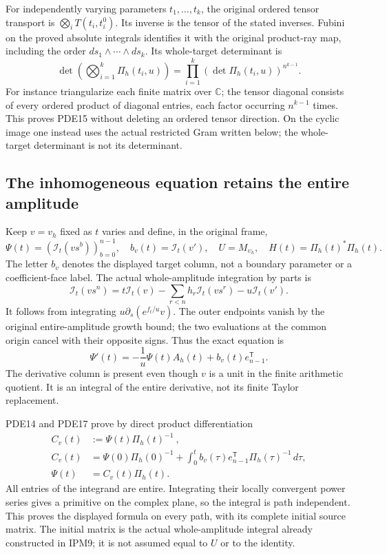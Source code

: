 For independently varying parameters $t_1,\ldots,t_k$, the original
ordered tensor transport is $\bigotimes_i T(t_i,t_i^0)$. Its inverse is
the tensor of the stated inverses. Fubini on the proved absolute
integrals identifies it with the original product-ray map, including
the order $ds_1\wedge\cdots\wedge ds_k$. Its whole-target determinant is
\[
 \det\left(\bigotimes_{i=1}^k\Pi_h(t_i,u)\right)
             =\prod_{i=1}^k(\det\Pi_h(t_i,u))^{n^{k-1}}.
 \tag{PDE15}
\]
For instance triangularize each finite matrix over $\mathbb{C}$;
the tensor diagonal consists of every ordered product of diagonal
entries, each factor occurring $n^{k-1}$ times. This proves PDE15
without deleting an ordered tensor direction. On the cyclic image
one instead uses the actual restricted Gram written below; the
whole-target determinant is not its determinant.

\subsection{The inhomogeneous equation retains the entire amplitude}

Keep $v=v_h$ fixed as $t$ varies and define, in the original frame,
\[
 \Psi(t)=(\mathcal I_t(vs^b))_{b=0}^{n-1},\quad
 b_v(t)=\mathcal I_t(v'),\quad
 U=M_{\upsilon_h},\quad H(t)=\Pi_h(t)^*\Pi_h(t).
 \tag{PDE16}
\]
The letter $b_v$ denotes the displayed target column, not a boundary
parameter or a coefficient-face label. The actual whole-amplitude
integration by parts is
\[
 \mathcal I_t(vs^n)
    =t\mathcal I_t(v)-\sum_{r<n}h_r\mathcal I_t(vs^r)
                             -u\mathcal I_t(v').
\]
It follows from integrating $u\partial_s(e^{f_t/u}v)$.
The outer endpoints vanish by the original entire-amplitude growth
bound; the two evaluations at the common origin cancel with their
opposite signs. Thus the exact equation is
\[
 \Psi'(t)=-\frac1u\Psi(t)A_h(t)+b_v(t)e_{n-1}^{\mathsf T}.
 \tag{PDE17}
\]
The derivative column is present even though $v$ is a unit in the
finite arithmetic quotient. It is an integral of the entire derivative,
not its finite Taylor replacement.

PDE14 and PDE17 prove by direct product differentiation
\[
 \begin{split}
 C_v(t)&:=\Psi(t)\Pi_h(t)^{-1}\ ,\\
 C_v(t)&=\Psi(0)\Pi_h(0)^{-1}
      +\int_0^t b_v(\tau)e_{n-1}^{\mathsf T}
                                         \Pi_h(\tau)^{-1}\,d\tau,\\
 \Psi(t)&=C_v(t)\Pi_h(t).
 \end{split}
 \tag{PDE18}
\]
All entries of the integrand are entire. Integrating their locally
convergent power series gives a primitive on the complex plane, so
the integral is path independent. This proves the displayed formula
on every path, with its complete initial source matrix. The initial
matrix is the actual whole-amplitude integral already constructed in
IPM9; it is not assumed equal to $U$ or to the identity.

